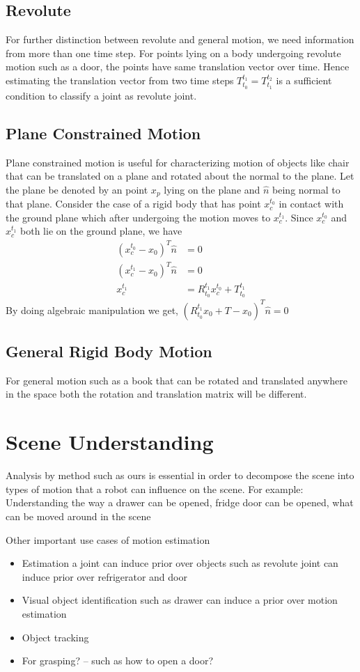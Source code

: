 \documentclass[conference]{IEEEtran}
\begin{document}
\subsection{Revolute}
For further distinction between revolute and general motion, we need information from more than one time step. For points lying on a body undergoing revolute motion such as a door, the points have same translation vector over time. Hence estimating the translation vector from two time steps $T_{t_0}^{t_1} = T_{t_1}^{t_2}$ is a sufficient condition to classify a joint as revolute joint. 
\subsection{Plane Constrained Motion} Plane constrained motion is useful for characterizing motion of objects like chair that can be translated on a plane and rotated about the normal to the plane. Let the plane be denoted by an point $x_p$ lying on the plane and $\hat{n}$ being normal to that plane. Consider the case of a rigid body that has point $x_c^{t_0}$ in contact with the ground plane which after undergoing the motion moves to $x_c^{t_1}$. Since $x_c^{t_0}$ and $x_c^{t_1}$ both lie on the ground plane, we have
\begin{align}
(x_c^{t_0}-x_0)^T\hat{n}&=0\\
(x_c^{t_1}-x_0)^T\hat{n}&=0\\
x_c^{t_1} &= R_{t_0}^{t_1}x_c^{t_0}+T_{t_0}^{t_1}
\end{align}
By doing algebraic manipulation we get, $(R_{t_0}^{t_1}x_0+T-x_0)^T\hat{n}=0$

\subsection{General Rigid Body Motion}
For general motion such as a book that can be rotated and translated anywhere in the space both the rotation and translation matrix will be different. 
\section{Scene Understanding}
Analysis by method such as ours is essential in order to decompose the scene into types of motion that a robot can influence on the scene.
For example: Understanding the way a drawer can be opened, fridge door can be opened, what can be moved around in the scene

Other important use cases of motion estimation
\begin{itemize}
\item Estimation a joint can induce prior over objects such as revolute joint can induce prior over refrigerator and door
\item Visual object identification such as drawer can induce a prior over motion estimation
\item Object tracking 
\item For grasping? -- such as how to open a door?
\end{itemize}
\end{document}
